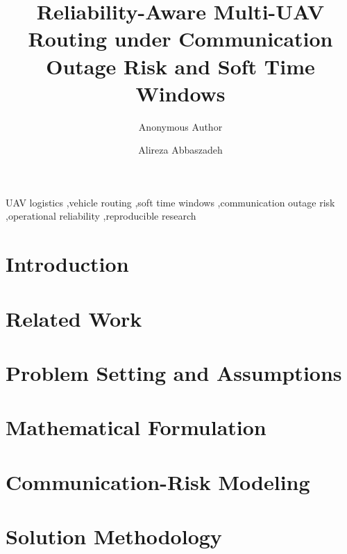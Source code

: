 \documentclass[review,12pt,authoryear]{elsarticle}
\begin{document}
\begin{frontmatter}

\title{Reliability-Aware Multi-UAV Routing under Communication Outage Risk and Soft Time Windows}

\ifdefined\ANON
  \author{Anonymous Author}
  \address{}
\else
  \author{Alireza Abbaszadeh}
  \address{Department of Computer Engineering, Islamic Azad University, Mashhad, Iran}
\fi

\begin{abstract}

\end{abstract}

\begin{keyword}
UAV logistics \sep vehicle routing \sep soft time windows \sep communication outage risk \sep operational reliability \sep reproducible research
\end{keyword}

\end{frontmatter}

\section{Introduction}


\section{Related Work}


\section{Problem Setting and Assumptions}


\section{Mathematical Formulation}


\section{Communication-Risk Modeling}


\section{Solution Methodology}

\end{document}
